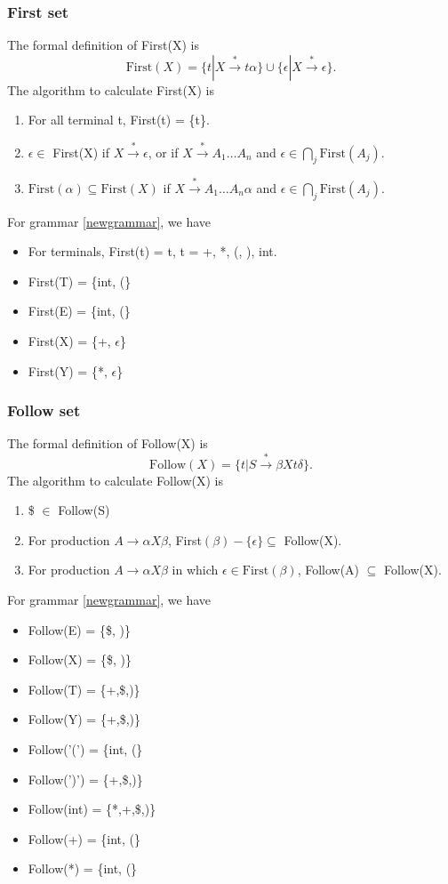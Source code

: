 \subsubsection{First set}
The formal definition of First(X) is 
\begin{equation}
\text{First}(X) = \{t|X\xrightarrow{*}t\alpha\}\cup\{\epsilon|X\xrightarrow{*}\epsilon\}.
\end{equation}
The algorithm to calculate First(X) is
\begin{enumerate}
\item For all terminal t, First(t) = \{t\}.
\item $\epsilon\in$ First(X) if $X\xrightarrow{*}\epsilon$, or if $X\xrightarrow{*}A_1\dots A_n$ and $\epsilon\in\bigcap\limits_j\text{First}(A_j)$.
\item $\text{First}(\alpha)\subseteq\text{First}(X)$ if $X\xrightarrow{*}A_1\dots A_n\alpha$ and $\epsilon\in\bigcap\limits_j\text{First}(A_j)$.
\end{enumerate}
For grammar \eqref{newgrammar}, we have 
\begin{itemize}
\item For terminals, First(t) = {t}, t = +, *, (, ), int.
\item First(T) = \{int, (\}
\item First(E) = \{int, (\}
\item First(X) = \{+, $\epsilon$\}
\item First(Y) = \{*, $\epsilon$\}
\end{itemize}
\subsubsection{Follow set}
The formal definition of Follow(X) is 
\begin{equation}
\text{Follow}(X) = \{t|S\xrightarrow{*}\beta Xt\delta\}.
\end{equation}
The algorithm to calculate Follow(X) is 
\begin{enumerate}
\item \$ $\in$ Follow(S)
\item For production $A\rightarrow\alpha X\beta$, First$(\beta) - \{\epsilon\}\subseteq$ Follow(X).
\item For production $A\rightarrow\alpha X\beta$ in which $\epsilon \in \text{First}(\beta)$, Follow(A) $\subseteq$ Follow(X).
\end{enumerate}
For grammar \eqref{newgrammar}, we have 
\begin{itemize}
\item Follow(E) = \{\$, )\}
\item Follow(X) = \{\$, )\}
\item Follow(T) = \{+,\$,)\}
\item Follow(Y) = \{+,\$,)\}
\item Follow('(') = \{int, (\}
\item Follow(')') = \{+,\$,)\}
\item Follow(int) = \{*,+,\$,)\}
\item Follow(+) = \{int, (\}
\item Follow(*) = \{int, (\}
\end{itemize}
